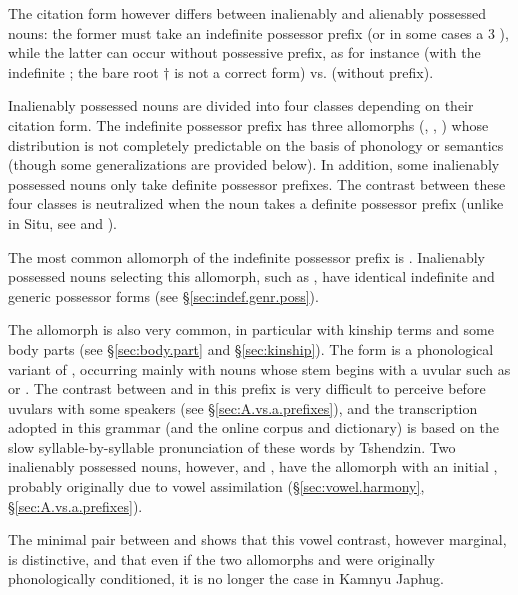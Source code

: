 The citation form however differs between inalienably and alienably possessed nouns: the former must take an indefinite possessor prefix (or in some cases a 3\sg{} ), while the latter can occur without possessive prefix, as for instance  (with the indefinite ; the bare root $\dagger$ is not a correct form) vs.  (without prefix).

Inalienably possessed nouns are divided into four classes depending on their citation form. The indefinite possessor prefix has three allomorphs (, , ) whose distribution is not completely predictable on the basis of phonology or semantics (though some generalizations are provided below). In addition, some inalienably possessed nouns only take definite possessor prefixes. The contrast between these four classes is neutralized when the noun takes a definite possessor prefix (unlike in Situ, see \citealt[168--169]{linxr93jiarong} and \citealt[118--119]{prins16kyomkyo}).

The most common allomorph of the indefinite possessor prefix is .  Inalienably possessed nouns selecting this allomorph, such as , have identical indefinite and generic possessor forms (see §\ref{sec:indef.genr.poss}).

The allomorph  is also very common, in particular with kinship terms and some body parts (see §\ref{sec:body.part} and §\ref{sec:kinship}). The form  is a phonological variant of , occurring mainly with nouns whose stem begins with a uvular such as  or . The contrast between  and  in this prefix is very difficult to perceive before uvulars with some speakers (see §\ref{sec:A.vs.a.prefixes}), and the transcription adopted in this grammar (and the online corpus and dictionary) is based on the slow syllable-by-syllable pronunciation of these words by Tshendzin. Two inalienably possessed nouns, however,  and , have the  allomorph with an initial , probably originally due to vowel assimilation (§\ref{sec:vowel.harmony}, §\ref{sec:A.vs.a.prefixes}).

The minimal pair between  and  shows that this vowel contrast, however marginal, is distinctive, and that even if the two allomorphs  and  were originally phonologically conditioned, it is no longer the case in Kamnyu Japhug.

